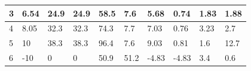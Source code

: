 \begin{table}[hbt!]
\begin{tabular}{|l|l|l|l|l|l|l|l|l|l|}
        3   & 6.54                                              & 24.9                                                & 24.9                                                & 58.5                                               & 7.6                                                & 5.68                                              & 0.74                                              & 1.83                                                       & 1.88                                                       \\ \hline
        4   & 8.05                                              & 32.3                                                & 32.3                                                & 74.3                                               & 7.7                                                & 7.03                                              & 0.76                                              & 3.23                                                       & 2.7                                                        \\ \hline
        5   & 10                                                & 38.3                                                & 38.3                                                & 96.4                                               & 7.6                                                & 9.03                                              & 0.81                                              & 1.6                                                        & 12.7                                                       \\ \hline
        6   & -10                                               & 0                                                   & 0                                                   & 50.9                                               & 51.2                                               & -4.83                                             & -4.83                                             & 3.4                                                        & 0.6                                                        \\ \hline
    \end{tabular}
\end{table}

